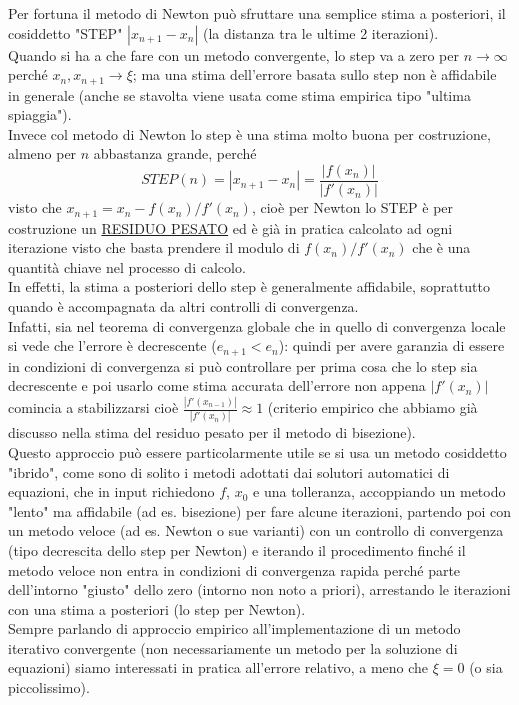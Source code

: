 \documentclass[12pt]{article}
\begin{document}
Per fortuna il metodo di Newton può sfruttare una semplice stima a posteriori, il cosiddetto "STEP" $|x_{n+1} - x_n|$ (la distanza tra le ultime 2 iterazioni).\\
Quando si ha a che fare con un metodo convergente, lo step va a zero per $n \to \infty$ perché $x_n, x_{n+1} \to \xi$; ma una stima dell'errore basata sullo step non è affidabile in generale (anche se stavolta viene usata come stima empirica tipo "ultima spiaggia").\\
Invece col metodo di Newton lo step è una stima molto buona per costruzione, almeno per $n$ abbastanza grande, perché
\begin{equation*}
    STEP(n) = |x_{n+1} - x_n| = \frac{|f(x_n)|}{|f'(x_n)|}
\end{equation*}
visto che $x_{n+1} = x_n - f(x_n) / f'(x_n)$, cioè per Newton lo STEP è per costruzione un \underline{RESIDUO PESATO} ed è già in pratica calcolato ad ogni iterazione visto che basta prendere il modulo di $f(x_n)/f'(x_n)$ che è una quantità chiave nel processo di calcolo.\\
In effetti, la stima a posteriori dello step è generalmente affidabile, soprattutto quando è accompagnata da altri controlli di convergenza.\\
Infatti, sia nel teorema di convergenza globale che in quello di convergenza locale si vede che l'errore è decrescente ($e_{n+1} < e_n$): quindi per avere garanzia di essere in condizioni di convergenza si può controllare per prima cosa che lo step sia decrescente e poi usarlo come stima accurata dell'errore non appena $|f'(x_n)|$ comincia a stabilizzarsi cioè $\frac{|f'(x_{n-1})|}{|f'(x_n)|} \approx 1$ (criterio empirico che abbiamo già discusso nella stima del residuo pesato per il metodo di bisezione).\\
Questo approccio può essere particolarmente utile se si usa un metodo cosiddetto "ibrido", come sono di solito i metodi adottati dai solutori automatici di equazioni, che in input richiedono $f$, $x_0$ e una tolleranza, accoppiando un metodo "lento" ma affidabile (ad es. bisezione) per fare alcune iterazioni, partendo poi con un metodo veloce (ad es. Newton o sue varianti) con un controllo di convergenza (tipo decrescita dello step per Newton) e iterando il procedimento finché il metodo veloce non entra in condizioni di convergenza rapida perché parte dell'intorno "giusto" dello zero (intorno non noto a priori), arrestando le iterazioni con una stima a posteriori (lo step per Newton).\\
Sempre parlando di approccio empirico all'implementazione di un metodo iterativo convergente (non necessariamente un metodo per la soluzione di equazioni) siamo interessati in pratica all'errore relativo, a meno che $\xi = 0$ (o sia piccolissimo).\\
\end{document}
